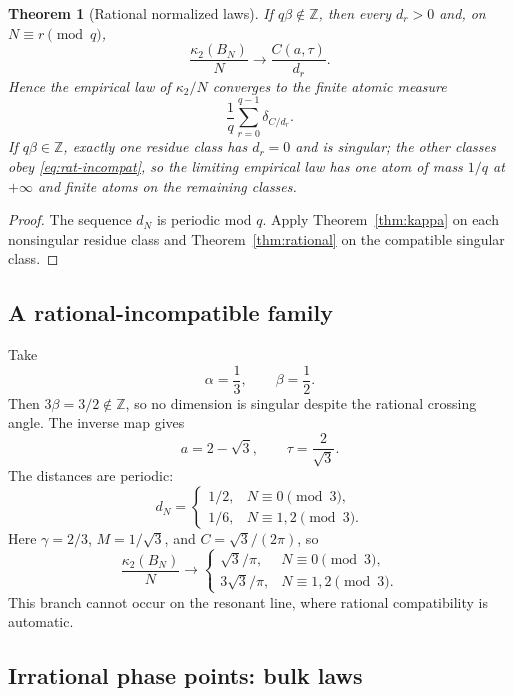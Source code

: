 \documentclass[11pt,reqno]{amsart}
\theoremstyle{plain}
\newtheorem{theorem}{Theorem}
\theoremstyle{definition}
\newcommand{\BN}{B_N}
\newcommand{\Z}{\mathbb{Z}}
\begin{document}
\begin{theorem}[Rational normalized laws]\label{thm:rational-laws}
If $q\beta\notin\Z$, then every $d_r>0$ and, on $N\equiv r\pmod q$,
\begin{equation}\label{eq:rat-incompat}
\frac{\kappa_2(\BN)}{N}
\longrightarrow
\frac{C(a,\tau)}{d_r}.
\end{equation}
Hence the empirical law of $\kappa_2/N$ converges to the finite atomic measure
\begin{equation}\label{eq:rat-measure}
\frac1q\sum_{r=0}^{q-1}\delta_{C/d_r}.
\end{equation}
If $q\beta\in\Z$, exactly one residue class has $d_r=0$ and is singular; the other
classes obey \eqref{eq:rat-incompat}, so the limiting empirical law has one atom of
mass $1/q$ at $+\infty$ and finite atoms on the remaining classes.
\end{theorem}

\begin{proof}
The sequence $d_N$ is periodic mod $q$.  Apply Theorem~\ref{thm:kappa} on each
nonsingular residue class and Theorem~\ref{thm:rational} on the compatible singular
class.
\end{proof}

\subsection*{A rational-incompatible family}
Take
\[
\alpha=\frac13,
\qquad
\beta=\frac12.
\]
Then $3\beta=3/2\notin\Z$, so no dimension is singular despite the rational crossing
angle.  The inverse map gives
\begin{equation}\label{eq:incomp-example}
 a=2-\sqrt3,
\qquad
\tau=\frac2{\sqrt3}.
\end{equation}
The distances are periodic:
\[
d_N=
\begin{cases}
1/2,&N\equiv0\pmod3,\\
1/6,&N\equiv1,2\pmod3.
\end{cases}
\]
Here $\gamma=2/3$, $M=1/\sqrt3$, and $C=\sqrt3/(2\pi)$, so
\[
\frac{\kappa_2(\BN)}{N}\longrightarrow
\begin{cases}
\sqrt3/\pi,&N\equiv0\pmod3,\\
3\sqrt3/\pi,&N\equiv1,2\pmod3.
\end{cases}
\]
This branch cannot occur on the resonant line, where rational compatibility is
automatic.


\subsection{Irrational phase points: bulk laws}
\end{document}
